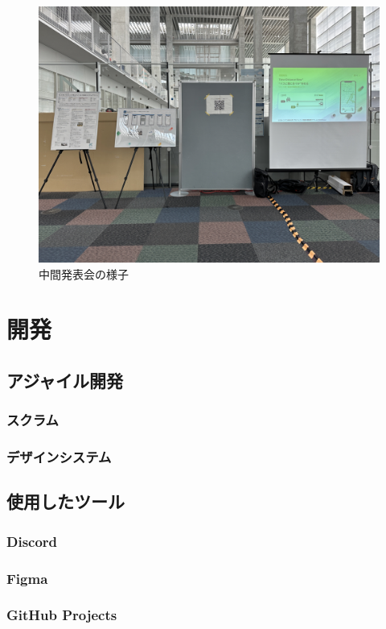 \begin{figure}[H]
    \centering
    \includegraphics[width=12cm]{images/mid_presentation.png}
    \caption{中間発表会の様子}
    \label{fig:mid_presentation}
\end{figure}

\section{開発}
\subsection{アジャイル開発}
\subsubsection{スクラム}
\subsubsection{デザインシステム}
\subsection{使用したツール}
\subsubsection{Discord}
\subsubsection{Figma}
\subsubsection{GitHub Projects}
